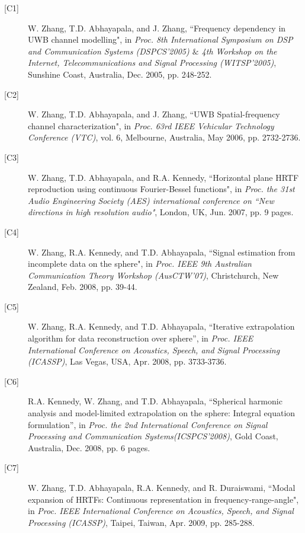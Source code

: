 \documentclass[11pt]{article}
\begin{document}
\begin{description}

\item[{[}C1{]}]W. Zhang, T.D. Abhayapala, and J. Zhang, ``Frequency dependency in UWB channel modelling", in \emph{Proc. 8th International Symposium on DSP and Communication Systems (DSPCS'2005) $\&$ 4th Workshop on the Internet, Telecommunications and Signal
Processing (WITSP'2005)}, Sunshine Coast, Australia, Dec. 2005, pp. 248-252.

\item[{[}C2{]}]W. Zhang, T.D. Abhayapala, and J. Zhang, ``UWB Spatial-frequency channel characterization",
in \emph{Proc. 63rd IEEE Vehicular Technology Conference (VTC)}, vol. 6, Melbourne, Australia, May 2006, pp. 2732-2736.

\item[{[}C3{]}]W. Zhang, T.D. Abhayapala, and R.A. Kennedy, ``Horizontal plane HRTF reproduction using continuous Fourier-Bessel functions",
in \emph{Proc. the 31st Audio Engineering Society (AES) international conference on ``New directions in high resolution audio"}, London, UK,
Jun. 2007, pp. 9 pages.

\item[{[}C4{]}]W. Zhang, R.A. Kennedy, and T.D. Abhayapala, ``Signal estimation from incomplete data on the sphere",
in \emph{Proc. IEEE 9th Australian Communication Theory Workshop (AusCTW'07)}, Christchurch, New Zealand, Feb. 2008, pp. 39-44.

\item[{[}C5{]}]W. Zhang, R.A. Kennedy, and T.D. Abhayapala, ``Iterative extrapolation algorithm for data reconstruction over sphere'',
in \emph{Proc. IEEE International Conference on Acoustics, Speech, and Signal Processing (ICASSP)}, Las Vegas, USA, Apr. 2008, pp. 3733-3736.

\item[{[}C6{]}]R.A. Kennedy, W. Zhang, and T.D. Abhayapala, ``Spherical harmonic analysis and model-limited
extrapolation on the sphere: Integral equation formulation'', in \emph{Proc. the 2nd International Conference on Signal Processing and
Communication Systems(ICSPCS'2008)}, Gold Coast, Australia, Dec. 2008, pp. 6 pages.

\item[{[}C7{]}]W. Zhang, T.D. Abhayapala, R.A. Kennedy, and R. Duraiswami, ``Modal expansion of HRTFs:
Continuous representation in frequency-range-angle", in \emph{Proc. IEEE International Conference on Acoustics, Speech, and Signal Processing
(ICASSP)}, Taipei, Taiwan, Apr. 2009, pp. 285-288.


\end{description}
\end{document}
